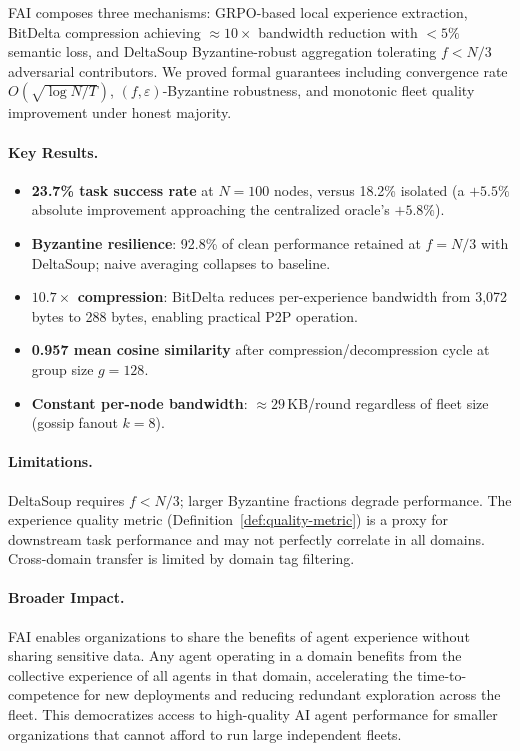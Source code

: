 \documentclass[11pt]{article}
\begin{document}
FAI composes three mechanisms: GRPO-based local experience extraction,
BitDelta compression achieving ${\approx}10\times$ bandwidth reduction with
$<5\%$ semantic loss, and DeltaSoup Byzantine-robust aggregation tolerating
$f < N/3$ adversarial contributors. We proved formal guarantees including
convergence rate $O(\sqrt{\log N / T})$, $(f,\varepsilon)$-Byzantine robustness,
and monotonic fleet quality improvement under honest majority.

\paragraph{Key Results.}
\begin{itemize}[leftmargin=1.5em]
    \item \textbf{23.7\% task success rate} at $N=100$ nodes, versus 18.2\%
          isolated (a $+5.5\%$ absolute improvement approaching the centralized
          oracle's $+5.8\%$).
    \item \textbf{Byzantine resilience}: 92.8\% of clean performance retained
          at $f = N/3$ with DeltaSoup; naive averaging collapses to baseline.
    \item \textbf{$10.7\times$ compression}: BitDelta reduces per-experience
          bandwidth from 3,072 bytes to 288 bytes, enabling practical P2P operation.
    \item \textbf{0.957 mean cosine similarity} after compression/decompression
          cycle at group size $g = 128$.
    \item \textbf{Constant per-node bandwidth}: ${\approx}29$\,KB/round
          regardless of fleet size (gossip fanout $k=8$).
\end{itemize}

\paragraph{Limitations.}
DeltaSoup requires $f < N/3$; larger Byzantine fractions degrade performance.
The experience quality metric (Definition~\ref{def:quality-metric}) is a proxy
for downstream task performance and may not perfectly correlate in all domains.
Cross-domain transfer is limited by domain tag filtering.

\paragraph{Broader Impact.}
FAI enables organizations to share the benefits of agent experience without
sharing sensitive data. Any agent operating in a domain benefits from the
collective experience of all agents in that domain, accelerating the
time-to-competence for new deployments and reducing redundant exploration
across the fleet. This democratizes access to high-quality AI agent performance
for smaller organizations that cannot afford to run large independent fleets.
\end{document}
